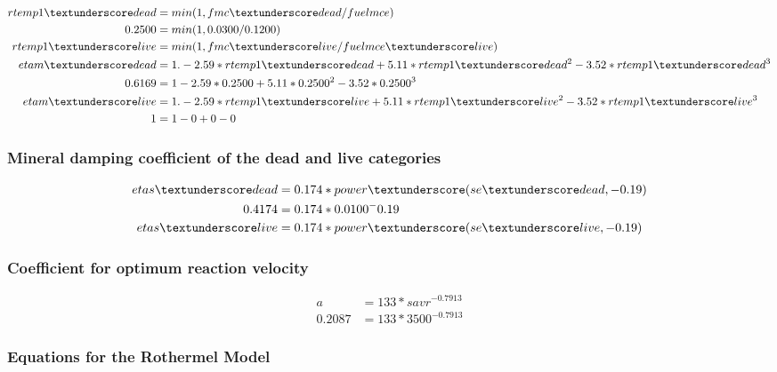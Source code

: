 \documentclass{article}
\newcommand\und{\textunderscore}
\begin{document}
\begin{equation}
	\label{damping_moisture_WFA}
	\begin{split}
		rtemp1\und dead   &= min(1,fmc\und dead/fuelmce) \\
		0.2500 &= min(1, 0.0300 / 0.1200) \\
rtemp1\und live   &= min(1,fmc\und live/fuelmce\und live) \\
etam\und dead     &= 1. - 2.59*rtemp1\und dead + 5.11*rtemp1\und dead^2 - 3.52*rtemp1\und dead^3 \\
0.6169 &= 1 - 2.59 * 0.2500 + 5.11 * 0.2500 ^ 2 - 3.52 * 0.2500 ^ 3 \\
etam\und live     &= 1. - 2.59*rtemp1\und live + 5.11*rtemp1\und live^2 - 3.52*rtemp1\und live^3 \\
1 &= 1 - 0 + 0 - 0
	\end{split}
\end{equation}

\subsubsection{Mineral damping coefficient of the dead and live categories}

\begin{equation}
\label{mineral_damping_WFA}
\begin{split}
	etas\und dead &= 0.174* power\und (se\und dead, -0.19) \\
		0.4174 &= 0.174 * 0.0100^-0.19 \\
	etas\und live &= 0.174* power\und (se\und live, -0.19) 
\end{split}
\end{equation}

\subsubsection{Coefficient for optimum reaction velocity}
\begin{equation}
	\label{rxn_vel_WFA}
	\begin{split}
		a &= 133 * savr ^ {-0.7913} \\
		0.2087 &= 133 * 3500^{-0.7913}
	\end{split}
\end{equation}

\subsubsection*{Equations for the Rothermel Model}
\end{document}
